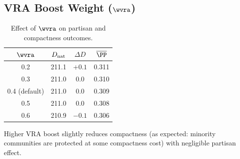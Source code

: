 \subsection{VRA Boost Weight ($\wvra$)}

\begin{table}[h]
\centering
\caption{Effect of $\wvra$ on partisan and compactness outcomes.}
\label{tab:wvra-results}
\begin{tabular}{cccc}
\toprule
$\wvra$ & $D_{\rm nat}$ & $\Delta D$ & $\overline{\PP}$ \\
\midrule
0.2 & 211.1 & $+0.1$ & 0.311 \\
0.3 & 211.0 &  0.0   & 0.310 \\
0.4 (default) & 211.0 & 0.0 & 0.309 \\
0.5 & 211.0 &  0.0   & 0.308 \\
0.6 & 210.9 & $-0.1$ & 0.306 \\
\bottomrule
\end{tabular}
\end{table}

Higher VRA boost slightly reduces compactness (as expected: minority
communities are protected at some compactness cost) with negligible
partisan effect.
